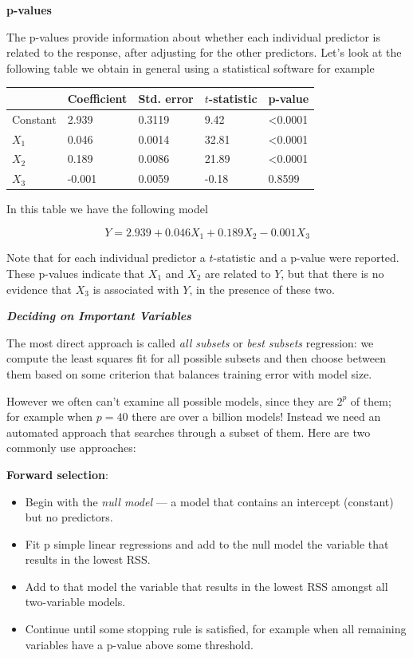\documentclass[]{book}
\providecommand{\tightlist}{%
  \setlength{\itemsep}{0pt}\setlength{\parskip}{0pt}}
\begin{document}
\textbf{p-values}

The p-values provide information about whether each individual predictor
is related to the response, after adjusting for the other predictors.
Let's look at the following table we obtain in general using a
statistical software for example

\begin{longtable}[]{@{}lllll@{}}
\toprule
& Coefficient & Std. error & \(t\)-statistic & p-value\tabularnewline
\midrule
\endhead
Constant & 2.939 & 0.3119 & 9.42 & \textless{}0.0001\tabularnewline
\(X_1\) & 0.046 & 0.0014 & 32.81 & \textless{}0.0001\tabularnewline
\(X_2\) & 0.189 & 0.0086 & 21.89 & \textless{}0.0001\tabularnewline
\(X_3\) & -0.001 & 0.0059 & -0.18 & 0.8599\tabularnewline
\bottomrule
\end{longtable}

In this table we have the following model

\[ Y = 2.939 + 0.046 X_1 + 0.189 X_2 - 0.001 X_3 \]

Note that for each individual predictor a \(t\)-statistic and a p-value
were reported. These p-values indicate that \(X_1\) and \(X_2\) are
related to \(Y\), but that there is no evidence that \(X_3\) is
associated with \(Y\), in the presence of these two.

\textbf{\emph{Deciding on Important Variables}}

The most direct approach is called \emph{all subsets} or \emph{best
subsets} regression: we compute the least squares fit for all possible
subsets and then choose between them based on some criterion that
balances training error with model size.

However we often can't examine all possible models, since they are
\(2^p\) of them; for example when \(p = 40\) there are over a billion
models! Instead we need an automated approach that searches through a
subset of them. Here are two commonly use approaches:

\textbf{Forward selection}:

\begin{itemize}
\tightlist
\item
  Begin with the \emph{null model} --- a model that contains an
  intercept (constant) but no predictors.
\item
  Fit p simple linear regressions and add to the null model the variable
  that results in the lowest RSS.
\item
  Add to that model the variable that results in the lowest RSS amongst
  all two-variable models.
\item
  Continue until some stopping rule is satisfied, for example when all
  remaining variables have a p-value above some threshold.
\end{itemize}
\end{document}
